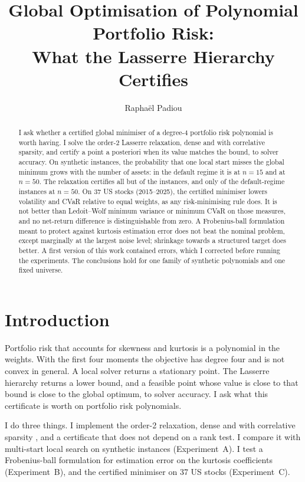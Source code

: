 \documentclass[11pt,a4paper]{article}
\title{Global Optimisation of Polynomial Portfolio Risk:\\What the Lasserre Hierarchy Certifies}
\author{Raphaël Padiou}
\date{}
\begin{document}
\maketitle

\begin{abstract}
I ask whether a certified global minimiser of a degree-4 portfolio risk polynomial is worth having.
I solve the order-2 Lasserre relaxation, dense and with correlative sparsity, and certify a point a posteriori when its value matches the bound, to solver accuracy.
On \aN{} synthetic instances, the probability that one local start misses the global minimum grows with the number of assets: in the default regime it is \aPfDefFifteen{} at $n=15$ and \aPfDefFifty{} at $n=50$.
The relaxation certifies all but \aUncert{} of the instances, and only \aDefFiftyCert{} of the default-regime instances at $n=50$.
On 37 US stocks (2015--2025), the certified minimiser lowers volatility and CVaR relative to equal weights, as any risk-minimising rule does.
It is not better than Ledoit--Wolf minimum variance or minimum CVaR on those measures, and no net-return difference is distinguishable from zero.
A Frobenius-ball formulation meant to protect against kurtosis estimation error does not beat the nominal problem, except marginally at the largest noise level; shrinkage towards a structured target does better.
A first version of this work contained errors, which I corrected before running the experiments.
The conclusions hold for one family of synthetic polynomials and one fixed universe.
\end{abstract}

\section{Introduction}
Portfolio risk that accounts for skewness and kurtosis is a polynomial in the weights.
With the first four moments the objective has degree four and is not convex in general.
A local solver returns a stationary point.
The Lasserre hierarchy \cite{lasserre2001} returns a lower bound, and a feasible point whose value is close to that bound is close to the global optimum, to solver accuracy.
I ask what this certificate is worth on portfolio risk polynomials.

I do three things.
I implement the order-2 relaxation, dense and with correlative sparsity \cite{waki2006}, and a certificate that does not depend on a rank test.
I compare it with multi-start local search on \aN{} synthetic instances (Experiment~A).
I test a Frobenius-ball formulation for estimation error on the kurtosis coefficients (Experiment~B), and the certified minimiser on 37 US stocks (Experiment~C).
\end{document}
